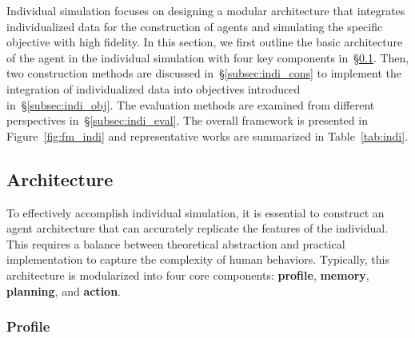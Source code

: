 Individual simulation focuses on designing a modular architecture that integrates individualized data for the construction of agents and simulating the specific objective with high fidelity.
In this section, we first outline the basic architecture of the agent in the individual simulation with four key components in~\S\ref{subsec:indi_arch}. Then, two construction methods are discussed in~\S\ref{subsec:indi_cons} to implement the integration of individualized data into objectives introduced in~\S\ref{subsec:indi_obj}. The evaluation methods are examined from different perspectives in~\S\ref{subsec:indi_eval}. The overall framework is presented in Figure~\ref{fig:fm_indi} and representative works are summarized in Table~\ref{tab:indi}.



\subsection{Architecture}\label{subsec:indi_arch}
To effectively accomplish individual simulation, it is essential to construct an agent architecture that can accurately replicate the features of the individual. This requires a balance between theoretical abstraction and practical implementation to capture the complexity of human behaviors. Typically, this architecture is modularized into four core components: \textbf{profile}, \textbf{memory}, \textbf{planning}, and \textbf{action}.



\subsubsection{Profile}

